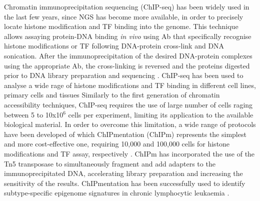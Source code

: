 Chromatin immunoprecipitation sequencing (ChIP-seq) has been widely used in the last few years, since NGS has become more available, in order to precisely locate histone modification and TF binding into the genome. This technique allows assaying protein-DNA binding \textit{in vivo} using Ab that specifically recognise histone modifications or TF following DNA-protein cross-link and DNA sonication. After the immunoprecipitation of the desired DNA-protein complexes using the appropriate Ab, the cross-linking is reversed and the proteins digested prior to DNA library preparation and sequencing \parencite{Solomon1988,Barski2007,Johnson2007}. ChIP-seq has been used to analyse a wide rage of histone modifications and TF binding in different cell lines, primary cells and tissues \parencite{ENCODE2012,Bernstein2010,Adams2012}Similarly to the first generation of chromatin accessibility techniques, ChIP-seq requires the use of large number of cells raging between 5 to 10x10$^6$ cells per experiment, limiting its application to the available biological material. In order to overcome this limitation, a wide range of protocols have been developed of which ChIPmentation (ChIPm) represents the simplest and more cost-effective one, requiring 10,000 and 100,000 cells for histone modifications and TF assay, respectively \parencite{Schmidl2015}. ChIPm has incorporated the use of the Tn5 transposase to simultaneously fragment and add adapters to the immunoprecipitated DNA, accelerating library preparation and increasing the sensitivity of the results. ChIPmentation has been successfully used to  identify subtype-specific epigenome signatures in chronic lymphocytic leukaemia \parencite{Rendeiro2015}.

 

